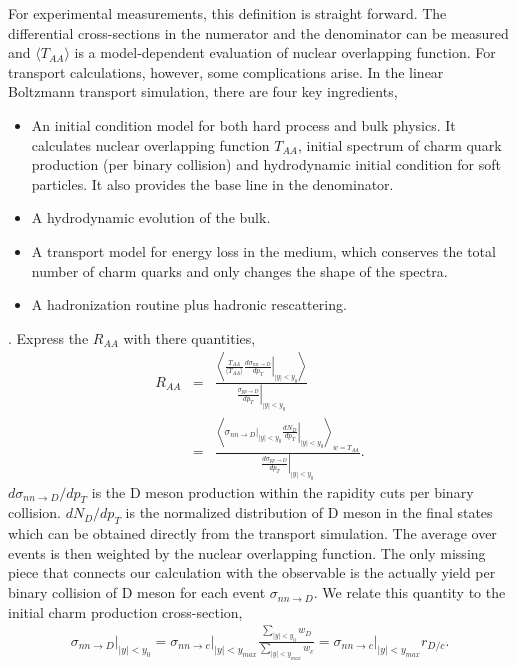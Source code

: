 \documentclass[10pt,a4paper]{article}
\newcommand{\Raa}{R_{AA}}
\begin{document}
For experimental measurements, this definition is straight forward. 
The differential cross-sections in the numerator and the denominator can be measured and $\langle T_{AA}\rangle$ is a model-dependent evaluation of nuclear overlapping function.
For transport calculations, however, some complications arise.
In the linear Boltzmann transport simulation, there are four key ingredients,
\begin{itemize}
\item An initial condition model for both hard process and bulk physics. 
It calculates nuclear overlapping function $T_{AA}$, initial spectrum of charm quark production (per binary collision) and hydrodynamic initial condition for soft particles. 
It also provides the base line in the denominator.
\item A hydrodynamic evolution of the bulk.
\item A transport model for energy loss in the medium, which conserves the  total number of charm quarks and only changes the shape of the spectra.
\item A hadronization routine plus hadronic rescattering.
\end{itemize} .
Express the $\Raa$ with there quantities,
\begin{eqnarray}
\Raa &=& \frac{\left\langle \left.\frac{T_{AA}}{\langle T_{AA}\rangle} \frac{d\sigma_{nn \rightarrow D}}{dp_T} \right|_{|y|<y_0} \right\rangle}{\left.  \frac{\sigma_{pp \rightarrow D}}{dp_T}\right|_{|y|<y_0}} \\
&=& \frac{\left\langle \left.\sigma_{nn \rightarrow D}\right|_{|y|<y_0} \left.\frac{d N_D}{dp_T} \right|_{|y|<y_0} \right\rangle_{w=T_{AA}}}{\left.  \frac{d\sigma_{pp \rightarrow D}}{dp_T}\right|_{|y|<y_0}}.
\end{eqnarray}
$d\sigma_{nn \rightarrow D}/dp_T$ is the D meson production within the rapidity cuts per binary collision.
$d N_D/dp_T$ is the normalized distribution of D meson in the final states which can be obtained directly from the transport simulation.
The average over events is then weighted by the nuclear overlapping function.
The only missing piece that connects our calculation with the observable is the actually yield per binary collision of D meson for each event $\sigma_{nn\rightarrow D}$.
We relate this quantity to the initial charm production cross-section,
\begin{eqnarray}
\left.\sigma_{nn\rightarrow D}\right|_{|y|<y_0} = \left.\sigma_{nn\rightarrow c} \right|_{|y|<y_{max}} \frac{\sum_{|y|<y_0}w_D}{\sum_{|y|<y_{max}}w_c} =  \left.\sigma_{nn\rightarrow c} \right|_{|y|<y_{max}} r_{D/c}.
\end{eqnarray}
\end{document}
